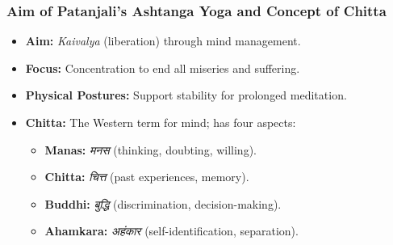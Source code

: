 \begin{frame}[fragile]\frametitle{Aim of Patanjali’s Ashtanga Yoga and Concept of Chitta}

    \begin{itemize}
        \item \textbf{Aim:} \textit{Kaivalya} (liberation) through mind management.
        \item \textbf{Focus:} Concentration to end all miseries and suffering.
        \item \textbf{Physical Postures:} Support stability for prolonged meditation.
        \item \textbf{Chitta:} The Western term for mind; has four aspects:
        \begin{itemize}
            \item \textbf{Manas:} \textit{मनस} (thinking, doubting, willing).
            \item \textbf{Chitta:} \textit{चित्त} (past experiences, memory).
            \item \textbf{Buddhi:} \textit{बुद्धि} (discrimination, decision-making).
            \item \textbf{Ahamkara:} \textit{अहंकार} (self-identification, separation).
        \end{itemize}
    \end{itemize}

\end{frame}

